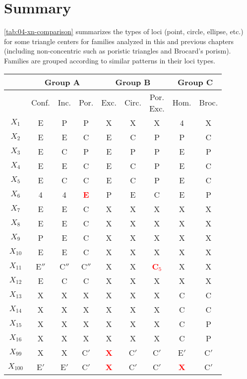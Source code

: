 \section{Summary}

\cref{tab:04-xn-comparison} summarizes the types of loci (point, circle, ellipse, etc.) for some triangle centers for families analyzed in this and previous chapters (including non-concentric such as poristic triangles and Brocard's porism). Families are grouped according to similar patterns in their loci types.

\begin{table}
\small
\centering
\begin{tabular}{|c||c|c|c||c|c|c||c|c||}
\hline
& \multicolumn{3}{c||}{Group A} & \multicolumn{3}{c||}{Group B} & \multicolumn{2}{c||}{Group C} \\
\hline
 & Conf. & Inc. & Por. & Exc. & Circ. &  \makecell{Por.\\Exc.} & Hom. & Broc. \\
 \hline
$X_1$ & E & P & P & X&X & X & 4 & X \\
$X_2$ & E & E & C & E&C & P & P & C \\
$X_3$ & E & C & P & E&P & P & E & P \\
$X_4$ & E & E & C & E&C & P & E & C \\
$X_5$ & E & C & C & E&C & P & E & C \\
$X_6$ & 4 & 4 & \textcolor{red}{\textbf{E}} & P&E & C & E & P \\
$X_7$ & E & E & C & X & X & X & X & X \\
$X_8$ & E & E & C & X & X & X & X & X \\
$X_9$ & P & E & C & X & X & X & X & X \\
$X_{10}$ & E & E & C & X & X & X & X & X \\
$X_{11}$ & E$''$ & C$''$ & C$''$ & X & X & \textcolor{red}{\textbf{C$_5$}} & X & X \\
$X_{12}$ & E & C & C & X & X & X & X & X \\
$X_{13}$ & X & X & X & X & X & X & C & C \\
$X_{14}$ & X & X & X & X & X & X & C & C \\
$X_{15}$ & X & X & X & X & X & X & C & P \\
$X_{16}$ & X & X & X & X & X & X & C & P \\
$X_{99}$ & X & X & C$'$ & \textcolor{red}{\textbf{X}}&C$'$ & C$'$ & E$'$ & C$'$ \\
$X_{100}$ & E$'$ & E$'$ & C$'$ & \textcolor{red}{\textbf{X}}&C$'$ & C$'$ & \textcolor{red}{\textbf{X}} & C$'$ \\

\end{tabular}
\end{table}
